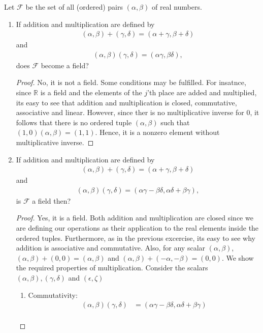\documentclass[12pt]{article}
\newcommand{\R}{\mathbb{R}}
\newenvironment{problem}[2][Problem]{\begin{trivlist} \item[\hskip \labelsep {\bfseries #1}\hskip \labelsep {\bfseries #2.}]}{\end{trivlist}}
\begin{document}
\begin{problem}{7}
  Let $\mathcal{F}$ be the set of all (ordered) pairs $(\alpha,\beta)$ of real numbers.
\begin{enumerate}
  \item If addition and multiplication are defined by 
\begin{align*}
  (\alpha,\beta)+(\gamma,\delta) = (\alpha+\gamma,\beta+\delta)
\end{align*}
and
\begin{align*}
  (\alpha,\beta)(\gamma,\delta) = (\alpha\gamma,\beta\delta),
\end{align*}
does $\mathcal{F}$ become a field?
\begin{proof}
  No, it is not a field. Some conditions may be fulfilled. For insatnce, since $\R$ is a field and the elements of the $j$'th place are added and multiplied, its easy to see that addition and multiplication is closed, commutative, associative and linear. However, since ther is no multiplicative inverse for 0, it follows that there is no ordered tuple $(\alpha,\beta)$ such that $(1,0)(\alpha,\beta) = (1,1)$. Hence, it is a nonzero element without multiplicative inverse.
\end{proof}
\item If addition and multiplication are defined by 
\begin{align*}
  (\alpha,\beta)+(\gamma,\delta) = (\alpha+\gamma,\beta+\delta)
\end{align*}
and
\begin{align*}
  (\alpha,\beta)(\gamma,\delta) = (\alpha\gamma-\beta\delta,\alpha\delta+\beta\gamma),
\end{align*}
is $\mathcal{F}$ a field then?
\begin{proof}
Yes, it is a field. Both addition and multiplication are closed since we are defining our operations as their application to the real elements inside the ordered tuples. Furthermore, as in the previous excercise, its easy to see why addition is associative and commutative. Also, for any scalar $(\alpha,\beta)$, $(\alpha,\beta)+(0,0) = (\alpha,\beta)$ and $(\alpha,\beta)+(-\alpha,-\beta) = (0,0)$. We show the required properties of multiplication. Consider the scalars $(\alpha,\beta), (\gamma,\delta)$ and $(\epsilon,\zeta)$\\
\begin{enumerate}[label= \arabic*.]
\item Commutativity:
\begin{align*}
  (\alpha,\beta)(\gamma,\delta) &= (\alpha\gamma-\beta\delta,\alpha\delta+\beta\gamma)\\

\end{align*}
\end{enumerate}
\end{proof}
\end{enumerate}
\end{problem}
\end{document}
